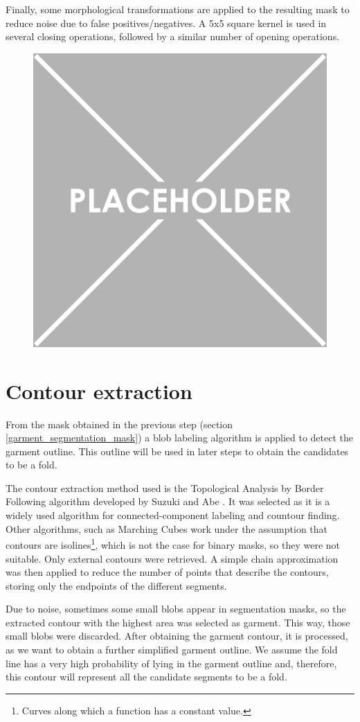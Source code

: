 Finally, some morphological transformations are applied to the resulting mask to reduce noise due to false positives/negatives. A 5x5 square kernel is used in several closing operations, followed by a similar number of opening operations.


\begin{figure}[thpb]
    \centering
    \includegraphics[width=0.48
    \textwidth]{figures/placeholder.png}
    \caption{}
    \label{fig:segmentation_mask}
\end{figure}

\section{Contour extraction}
From the mask obtained in the previous step (section \ref{garment_segmentation_mask}) a blob labeling algorithm is applied to detect the garment outline. This outline will be used in later steps to obtain the candidates to be a fold.

The contour extraction method used is the Topological Analysis by Border Following algorithm developed by Suzuki and Abe  {}. It was selected as it is a widely used algorithm for connected-component labeling and countour finding. Other algorithms, such as Marching Cubes  work under the assumption that contours are isolines\footnote{Curves along which a  function has a constant value.}, which is not the case for binary masks, so they were not suitable. Only external contours were retrieved. A simple chain approximation was then applied to reduce the number of points that describe the contours, storing only the endpoints of the different segments.

Due to noise, sometimes some small blobs appear in segmentation masks, so the extracted contour with the highest area was selected as garment. This way, those small blobs were discarded.
After obtaining the garment contour, it is processed, as we want to obtain a further simplified garment outline. We assume the fold line has a very high probability of lying in the garment outline and, therefore, this contour will represent all the candidate segments to be a fold. 

